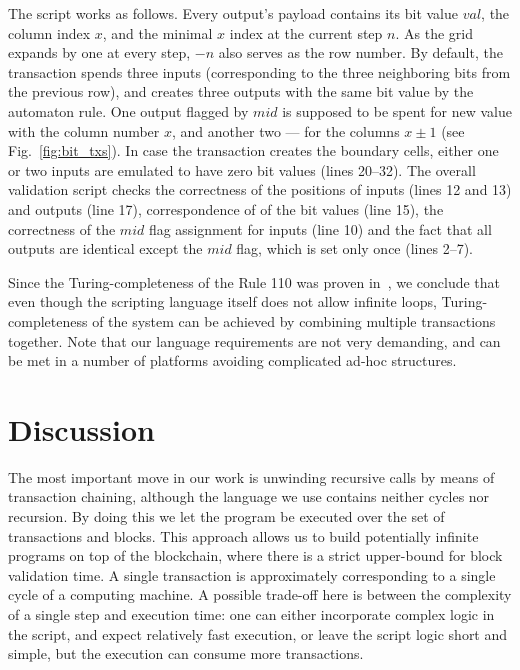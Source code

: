 \documentclass[runningheads]{llncs}
\begin{document}
	The script works as follows. Every output's payload contains its bit value
    $val$, 
    the column index $x$, and the minimal $x$ index at the current step $n$.
    As the
    grid expands by one at every step, $-n$ also serves as the row number. By
    default, the transaction spends three inputs (corresponding to the three
    neighboring bits from the previous row), and creates three outputs with the same
    bit value by the automaton rule. One output flagged by $mid$ is supposed to be
    spent for new value with the column number $x$, and another two --- for the
    columns $x\pm 1$ (see Fig.~\ref{fig:bit_txs}). In case the transaction creates the
    boundary cells, either one or two inputs are emulated to have zero bit values
    (lines 20--32).  The overall validation script checks the correctness of the
    positions of inputs (lines 12 and 13) and outputs (line 17), correspondence of
    of the bit values (line 15), the correctness of the $mid$  flag assignment for
    inputs (line 10) and the fact that all outputs are identical except the $mid$
    flag, which is set only once (lines 2--7).

    Since the Turing-completeness of the Rule 110 was proven
    in~\cite{cook2004universality}, we conclude that even though the scripting
    language itself does not allow infinite loops, Turing-completeness of the
    system can be achieved by combining multiple transactions together. Note
    that our language requirements are not very demanding, and can be met in a 
    number of platforms avoiding complicated ad-hoc structures.

    \section{Discussion}
    \label{section3}

    The most important move in our work is unwinding recursive calls by means
    of transaction chaining, although the language we use contains neither cycles nor
    recursion. By doing this we let the program be executed over the set of
    transactions and blocks. This approach allows us to build potentially infinite programs on top 
    of the blockchain, where there is a strict upper-bound for block validation time.
    A single transaction is approximately corresponding to a single cycle of a computing 
    machine. A possible trade-off here is between the complexity of a single step and execution
    time: one can either incorporate complex logic in the script, and expect
    relatively fast execution, or leave the script logic short and simple, but
    the execution can consume more transactions.
\end{document}
